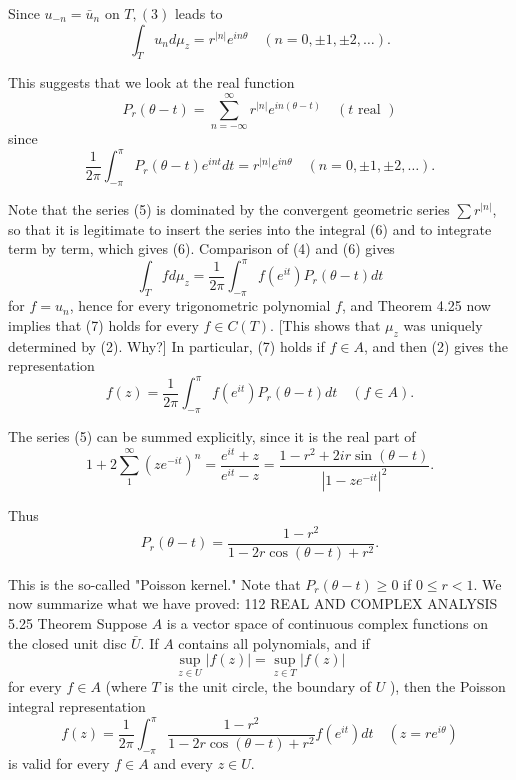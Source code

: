 Since $u_{-n}=\bar{u}_n$ on $T,(3)$ leads to
$$
\int_T u_n d \mu_z=r^{|n|} e^{i n \theta} \quad(n=0, \pm 1, \pm 2, \ldots) .
$$

This suggests that we look at the real function
$$
P_r(\theta-t)=\sum_{n=-\infty}^{\infty} r^{|n|} e^{i n(\theta-t)} \quad(t \text { real })
$$
since
$$
\frac{1}{2 \pi} \int_{-\pi}^\pi P_r(\theta-t) e^{i n t} d t=r^{|n|} e^{i n \theta} \quad(n=0, \pm 1, \pm 2, \ldots) .
$$

Note that the series (5) is dominated by the convergent geometric series $\sum r^{|n|}$, so that it is legitimate to insert the series into the integral (6) and to integrate term by term, which gives (6). Comparison of (4) and (6) gives
$$
\int_T f d \mu_z=\frac{1}{2 \pi} \int_{-\pi}^\pi f\left(e^{i t}\right) P_r(\theta-t) d t
$$
for $f=u_n$, hence for every trigonometric polynomial $f$, and Theorem 4.25 now implies that (7) holds for every $f \in C(T)$. [This shows that $\mu_z$ was uniquely determined by (2). Why?]
In particular, (7) holds if $f \in A$, and then (2) gives the representation
$$
f(z)=\frac{1}{2 \pi} \int_{-\pi}^\pi f\left(e^{i t}\right) P_r(\theta-t) d t \quad(f \in A) .
$$

The series (5) can be summed explicitly, since it is the real part of
$$
1+2 \sum_1^{\infty}\left(z e^{-i t}\right)^n=\frac{e^{i t}+z}{e^{i t}-z}=\frac{1-r^2+2 i r \sin (\theta-t)}{\left|1-z e^{-i t}\right|^2} .
$$

Thus
$$
P_r(\theta-t)=\frac{1-r^2}{1-2 r \cos (\theta-t)+r^2} .
$$

This is the so-called "Poisson kernel." Note that $P_r(\theta-t) \geq 0$ if $0 \leq r<1$. We now summarize what we have proved:
112 REAL AND COMPLEX ANALYSIS
5.25 Theorem Suppose $A$ is a vector space of continuous complex functions on the closed unit disc $\bar{U}$. If $A$ contains all polynomials, and if
$$
\sup _{z \in U}|f(z)|=\sup _{z \in T}|f(z)|
$$
for every $f \in A$ (where $T$ is the unit circle, the boundary of $U$ ), then the Poisson integral representation
$$
f(z)=\frac{1}{2 \pi} \int_{-\pi}^\pi \frac{1-r^2}{1-2 r \cos (\theta-t)+r^2} f\left(e^{i t}\right) d t \quad\left(z=r e^{i \theta}\right)
$$
is valid for every $f \in A$ and every $z \in U$.